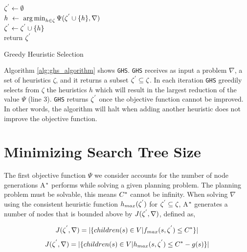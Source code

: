 \begin{algorithm}

$\zeta\sp{'} \leftarrow \emptyset$\\
 {
	$h\ \leftarrow\ \argminA_{h \in \zeta}  \Psi(\zeta\sp{'} \cup \{h\}, \nabla)$\\
	$\zeta\sp{'} \leftarrow \zeta\sp{'} \cup \{h\}$\\
} 
return $\zeta\sp{'}$
\caption{Greedy Heuristic Selection}
\label{alg:ghs_algorithm}
\end{algorithm}

Algorithm \ref{alg:ghs_algorithm} shows \texttt{GHS}. \texttt{GHS} receives as input a problem $\nabla$, a set of heuristics $\zeta$, and it returns a subset $\zeta\sp{'} \subseteq \zeta$. In each iteration \texttt{GHS} greedily selects from $\zeta$ the heuristics $h$ which will result in the largest reduction of the value $\Psi$ (line 3). \texttt{GHS} returns $\zeta\sp{'}$ once the objective function cannot be improved. In other words, the algorithm will halt when adding another heuristic does not improve the objective function.

\section{Minimizing Search Tree Size}
\noindent
The first objective function $\Psi$ we consider accounts for the number of node generations A$\sp{*}$ performs while solving a given planning problem. The planning problem must be solvable, this means $C\sp{*}$ cannot be infinity. When solving $\nabla$ using the consistent heuristic function $h_{max}(\zeta\sp{'})$  for $\zeta\sp{'} \subseteq \zeta$, A$\sp{*}$ generates a number of nodes that is bounded above by $J(\zeta\sp{'},\nabla)$, defined as,

\begin{equation}
J(\zeta\sp{'},\nabla) = |\{children(s) \in V | f_{max}(s,\zeta\sp{'}) \leq C\sp{*}\}|
\label{eq:eq_size_search_tree_1}
\end{equation}
\begin{equation}
J(\zeta\sp{'},\nabla) = |\{children(s) \in V | h_{max}(s,\zeta\sp{'}) \leq C\sp{*} - g(s)\}|
\label{eq:eq_size_search_tree_2}
\end{equation}

